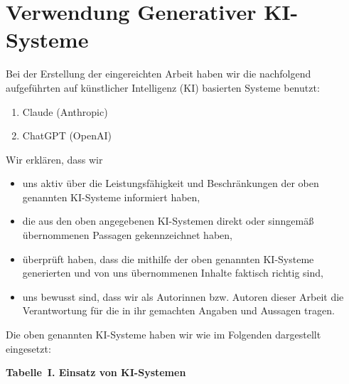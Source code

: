 \documentclass[conference,a4paper]{IEEEtran}
\begin{document}

\balance


 
\onecolumn
\newpage
\section*{Verwendung Generativer KI-Systeme}
 
Bei der Erstellung der eingereichten Arbeit haben wir die nachfolgend aufgeführten
auf künstlicher Intelligenz (KI) basierten Systeme benutzt:
 
\begin{enumerate}
  \item Claude (Anthropic)
  \item ChatGPT (OpenAI)
\end{enumerate}
 
Wir erklären, dass wir
\begin{itemize}
  \item uns aktiv über die Leistungsfähigkeit und Beschränkungen der oben genannten
        KI-Systeme informiert haben,
  \item die aus den oben angegebenen KI-Systemen direkt oder sinngemäß übernommenen
        Passagen gekennzeichnet haben,
  \item überprüft haben, dass die mithilfe der oben genannten KI-Systeme generierten
        und von uns übernommenen Inhalte faktisch richtig sind,
  \item uns bewusst sind, dass wir als Autorinnen bzw. Autoren dieser Arbeit die
        Verantwortung für die in ihr gemachten Angaben und Aussagen tragen.
\end{itemize}
 
Die oben genannten KI-Systeme haben wir wie im Folgenden dargestellt eingesetzt:
 
\vspace{0.5em}
\noindent\textbf{Tabelle~I. Einsatz von KI-Systemen}
 
\end{document}
